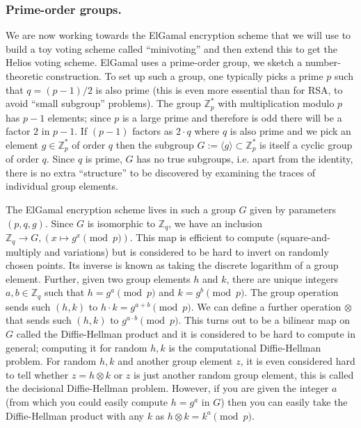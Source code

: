 \documentclass[envcountsame]{llncs}
\newenvironment{maths}{\begin{framed}
\vspace{-12pt}
\begin{figure}
\vspace{-12pt}\quad{\Huge $\sum$}
\end{figure}}{\end{framed}}
\begin{document}
\begin{maths}
\subsubsection{Prime-order groups.}
We are now working towards the ElGamal encryption scheme that we will use to
build a toy voting scheme called ``minivoting'' and then extend this to get the
Helios voting scheme. ElGamal uses a prime-order group, we sketch a
number-theoretic construction. To set up such a group, one typically picks a
prime $p$ such that $q = (p-1)/2$ is also prime (this is even more essential
than for RSA, to avoid ``small subgroup'' problems). The group $\mathbb Z^*_p$
with multiplication modulo $p$ has $p - 1$ elements; since $p$ is a large prime
and therefore is odd there will be a factor $2$ in $p-1$. If $(p-1)$ factors as
$2 \cdot q$ where $q$ is also prime and we pick an element $g \in \mathbb Z^*_p$
of order $q$ then the subgroup $G := \langle g \rangle \subset \mathbb Z^*_p$ is
itself a cyclic group of order $q$. Since $q$ is prime, $G$ has no true
subgroups, i.e. apart from the identity, there is no extra ``structure'' to be
discovered by examining the traces of individual group elements\footnotemark.

The ElGamal encryption scheme lives in such a group $G$ given by parameters $(p,
q, g)$. Since $G$ is isomorphic to $\mathbb Z_q$, we have an inclusion $\mathbb
Z_q \to G, (x \mapsto g^x \pmod{p})$. This map is efficient to compute
(square-and-multiply and variations) but is considered to be hard to invert on
randomly chosen points. Its inverse is known as taking the discrete logarithm of
a group element. Further, given two group elements $h$ and $k$, there are unique
integers $a, b \in \mathbb Z_q$ such that $h = g^a \pmod{p}$ and $k = g^b
\pmod{p}$. The group operation sends such $(h, k)$ to $h \cdot k = g^{a + b}
\pmod{p}$. We can define a further operation $\otimes$ that sends such $(h, k)$
to $g^{a \cdot b} \pmod{p}$. This turns out to be a bilinear map on $G$ called
the Diffie-Hellman product and it is considered to be hard to compute in
general; computing it for random $h, k$ is the computational Diffie-Hellman
problem. For random $h, k$ and another group element $z$, it is even considered
hard to tell whether $z = h \otimes k$ or $z$ is just another random group
element, this is called the decisional Diffie-Hellman problem. However, if you
are given the integer $a$ (from which you could easily compute $h = g^a$ in $G$)
then you can easily take the Diffie-Hellman product with any $k$ as $h \otimes k
= k^a \pmod{p}$.
\end{maths}
\end{document}
